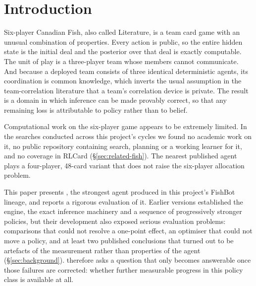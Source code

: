 \section{Introduction}
\label{sec:intro}

Six-player Canadian Fish, also called Literature, is a team card game with an unusual combination of
properties. Every action is public, so the entire hidden state is the initial deal and the posterior
over that deal is exactly computable. The unit of play is a three-player team whose members cannot
communicate. And because a deployed team consists of three identical deterministic agents, its
coordination is common knowledge, which inverts the usual assumption in the team-correlation
literature that a team's correlation device is private. The result is a domain in which inference can
be made provably correct, so that any remaining loss is attributable to policy rather than to belief.

Computational work on the six-player game appears to be extremely limited. In the searches conducted
across this project's cycles we found no academic work on it, no public repository containing search,
planning or a working learner for it, and no coverage in RLCard \cite{rlcard}
(\S\ref{sec:related-fish}). The nearest published agent plays a four-player,
48-card variant that does not raise the six-player allocation problem.

This paper presents \textbf{\sestina{}}, the strongest agent produced in this project's FishBot
lineage, and reports a rigorous evaluation of it. Earlier versions established the engine, the exact
inference machinery and a sequence of progressively stronger policies, but their development also
exposed serious evaluation problems: comparisons that could not resolve a one-point effect, an
optimiser that could not move a policy, and at least two published conclusions that turned out to be
artefacts of the measurement rather than properties of the agent (\S\ref{sec:background}).
\sestina{} therefore asks a question that only becomes answerable once those failures are
corrected: whether further measurable progress in this policy class is available at all.

